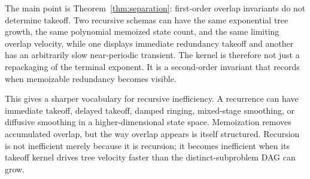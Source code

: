 \documentclass[10pt,twocolumn]{article}
\begin{document}
The main point is Theorem~\ref{thm:separation}: first-order overlap invariants do not determine takeoff.  Two recursive schemas can have the same exponential tree growth, the same polynomial memoized state count, and the same limiting overlap velocity, while one displays immediate redundancy takeoff and another has an arbitrarily slow near-periodic transient.  The kernel is therefore not just a repackaging of the terminal exponent.  It is a second-order invariant that records when memoizable redundancy becomes visible.

This gives a sharper vocabulary for recursive inefficiency.  A recurrence can have immediate takeoff, delayed takeoff, damped ringing, mixed-stage smoothing, or diffusive smoothing in a higher-dimensional state space.  Memoization removes accumulated overlap, but the way overlap appears is itself structured.  Recursion is not inefficient merely because it is recursion; it becomes inefficient when its takeoff kernel drives tree velocity faster than the distinct-subproblem DAG can grow.
\end{document}

